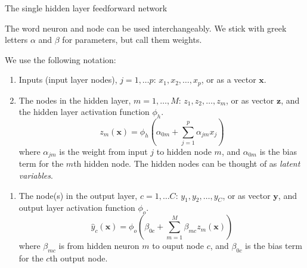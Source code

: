 \documentclass[10pt,ignorenonframetext,]{beamer}
\providecommand{\tightlist}{%
  \setlength{\itemsep}{0pt}\setlength{\parskip}{0pt}}
\begin{document}
\begin{frame}

\begin{block}{The single hidden layer feedforward network}

The word neuron and node can be used interchangeably. We stick with
greek letters \(\alpha\) and \(\beta\) for parameters, but call them
weights.

We use the following notation:

\begin{enumerate}
\def\labelenumi{\arabic{enumi}.}
\tightlist
\item
  Inputs (input layer nodes), \(j=1,\dots p\):
  \(x_1, x_2, \ldots, x_p\), or as a vector \({\boldsymbol x}\).
\item
  The nodes in the hidden layer, \(m=1,\ldots, M\):
  \(z_1, z_2, \ldots, z_m\), or as vector \({\boldsymbol z}\), and the
  hidden layer activation function \(\phi_h\). \[
  z_m({\boldsymbol x})=\phi_h(\alpha_{0m}+\sum_{j=1}^p \alpha_{jm}x_{j})
  \] where \(\alpha_{jm}\) is the weight from input \(j\) to hidden node
  \(m\), and \(\alpha_{0m}\) is the bias term for the \(m\)th hidden
  node. The hidden nodes can be thought of as \emph{latent variables}.
\end{enumerate}

\end{block}

\end{frame}

\begin{frame}

\begin{enumerate}
\def\labelenumi{\arabic{enumi}.}
\setcounter{enumi}{2}
\tightlist
\item
  The node(s) in the output layer, \(c=1,\ldots C\):
  \(y_1, y_2, \ldots, y_C\), or as vector \({\boldsymbol y}\), and
  output layer activation function \(\phi_o\). \[
  \hat{y}_c({\boldsymbol x})=\phi_o(\beta_{0c}+\sum_{m=1}^M \beta_{mc}z_{m}({\boldsymbol x}))
  \] where \(\beta_{mc}\) is from hidden neuron \(m\) to ouput node
  \(c\), and \(\beta_{0c}\) is the bias term for the \(c\)th output
  node.
\end{enumerate}

\end{frame}
\end{document}
